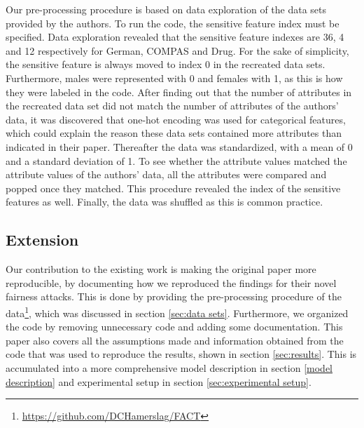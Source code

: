 Our pre-processing procedure is based on data exploration of the data sets provided by the authors. To run the code, the sensitive feature index must be specified. Data exploration revealed that the sensitive feature indexes are 36, 4 and 12 respectively for German, COMPAS and Drug. For the sake of simplicity, the sensitive feature is always moved to index 0 in the recreated data sets.
Furthermore, males were represented with 0 and females with 1, as this is how they were labeled in the code. After finding out that the number of attributes in the recreated data set did not match the number of attributes of the authors' data, it was discovered that one-hot encoding was used for categorical features, which could explain the reason these data sets contained more attributes than indicated in their paper. Thereafter the data was standardized, with a mean of 0 and a standard deviation of 1. To see whether the attribute values matched the attribute values of the authors' data, all the attributes were compared and popped once they matched. This procedure revealed the index of the sensitive features as well. Finally, the data was shuffled as this is common practice.




\subsection{Extension}
\label{extension}

Our contribution to the existing work is making the original paper more reproducible, by documenting how we reproduced the findings for their novel fairness attacks.
This is done by providing the pre-processing procedure of the data\footnote{\href{https://github.com/DCHamerslag/FACT}{https://github.com/DCHamerslag/FACT}}, which was discussed in section \ref{sec:data sets}.
Furthermore, we organized the code by removing unnecessary code and adding some documentation.
This paper also covers all the assumptions made and information obtained from the code that was used to reproduce the results, shown in section \ref{sec:results}. This is accumulated into a more comprehensive model description in section \ref{model description} and experimental setup in section \ref{sec:experimental setup}.


